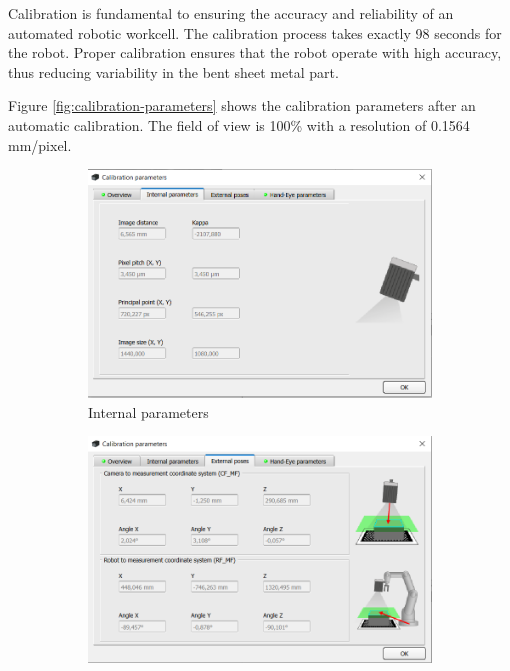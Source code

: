 Calibration is fundamental to ensuring the accuracy and reliability of an automated robotic workcell. The calibration process takes exactly 98 seconds for the robot. Proper calibration ensures that the robot operate with high accuracy, thus reducing variability in the bent sheet metal part.

Figure \ref{fig:calibration-parameters} shows the calibration parameters after an automatic calibration. The field of view is 100\% with a resolution of 0.1564 mm/pixel.

\begin{figure}[h]
    \centering
    \begin{subfigure}{0.48\textwidth}
        \centering
        \includegraphics[width=\textwidth]{figures/001calibration/internal_parameters.PNG}
        \caption{Internal parameters}
        \label{subfig:internal-parameters}
    \end{subfigure}\hspace{0cm}
    \begin{subfigure}{0.48\textwidth}
        \centering
        \includegraphics[width=\textwidth]{figures/001calibration/external_poses.PNG}

\end{subfigure}
\end{figure}
